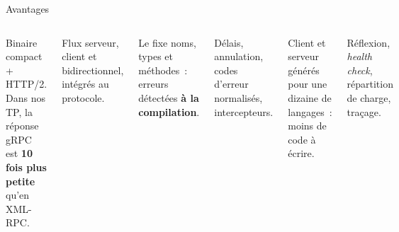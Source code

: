 \documentclass[aspectratio=169,11pt]{beamer}
\begin{document}
\begin{frame}{Avantages}
  \vspace{0.1cm}
  \begin{columns}[T,onlytextwidth]
    \begin{carte}[ggreen,height=2.55cm]\footnotesize Binaire compact + HTTP/2. Dans nos TP, la réponse gRPC est \textbf{10 fois plus petite} qu'en XML-RPC.\end{carte}
    \begin{carte}[ggreen,height=2.55cm]\footnotesize Flux serveur, client et bidirectionnel, intégrés au protocole.\end{carte}
    \begin{carte}[ggreen,height=2.55cm]\footnotesize Le  fixe noms, types et méthodes~: erreurs détectées \textbf{à la compilation}.\end{carte}
    \begin{carte}[ggreen,height=2.55cm]\footnotesize Délais, annulation, codes d'erreur normalisés, intercepteurs.\end{carte}
    \begin{carte}[ggreen,height=2.55cm]\footnotesize Client et serveur générés pour une dizaine de langages~: moins de code à écrire.\end{carte}
    \begin{carte}[ggreen,height=2.55cm]\footnotesize Réflexion, \emph{health check}, répartition de charge, traçage.\end{carte}
  \end{columns}
\end{frame}
\end{document}
